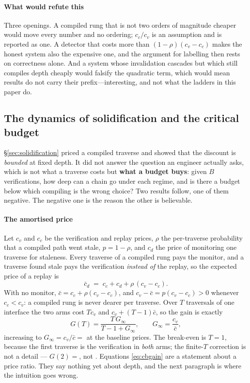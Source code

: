 \documentclass[conference]{IEEEtran}
\theoremstyle{definition}
\begin{document}
\paragraph{What would refute this} Three openings. A compiled rung that is not two
orders of magnitude cheaper would move every number and no ordering; $c_c/c_v$ is an
assumption and is reported as one. A detector that costs more than
$(1-\rho)(c_v-c_c)$ makes the honest system also the expensive one, and the argument
for labelling then rests on correctness alone. And a system whose invalidation
cascades but which still compiles depth cheaply would falsify the quadratic term,
which would mean results do not carry their prefix---interesting, and not what the
ladders in this paper do.

\subsection{The dynamics of solidification and the critical budget}
\label{sec:criticalbudget}

\S\ref{sec:solidification} priced a compiled traverse and showed that the discount
is \emph{bounded} at fixed depth. It did not answer the question an engineer
actually asks, which is not what a traverse costs but \textbf{what a budget buys}:
given $B$ verifications, how deep can a chain go under each regime, and is there a
budget below which compiling is the wrong choice? Two results follow, one of them
negative. The negative one is the reason the other is believable.

\paragraph{The amortised price} Let $c_v$ and $c_c$ be the verification and replay
prices, $\rho$ the per-traverse probability that a compiled path went stale, $p=1-\rho$,
and $c_d$ the price of monitoring one traverse for staleness. Every traverse of a
compiled rung pays the monitor, and a traverse found stale pays the verification
\emph{instead of} the replay, so the expected price of a replay is
\begin{equation}
\bar c_d \;=\; c_c + c_d + \rho\,(c_v-c_c).
\label{eq:cbprice}
\end{equation}
With no monitor, $\bar c=c_c+\rho(c_v-c_c)$, and $c_v-\bar c=p(c_v-c_c)>0$ whenever
$c_c<c_v$: a compiled rung is never dearer per traverse. Over $T$ traversals of one
interface the two arms cost $T c_v$ and $c_v+(T-1)\bar c$, so the gain is exactly
\begin{equation}
G(T)=\frac{T\,G_\infty}{T-1+G_\infty},
\qquad
G_\infty=\frac{c_v}{\bar c},
\label{eq:cbgain}
\end{equation}
increasing to $G_\infty=c_v/\bar c=$\cbGain{} at the baseline prices. The break-even
is $T=1$, because the first traverse is the verification in \emph{both} arms; the
finite-$T$ correction is not a detail --- $G(2)=$\cbGainTwo, not \cbGain. Equations
\eqref{eq:cbgain} are a statement about a price ratio. They say nothing yet about
depth, and the next paragraph is where the intuition goes wrong.
\end{document}
